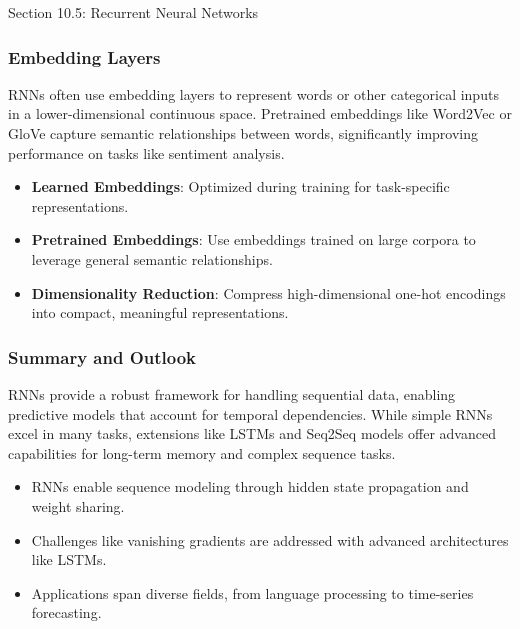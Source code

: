 \begin{notes}{Section 10.5: Recurrent Neural Networks}
    \subsubsection*{Embedding Layers}
    
    RNNs often use embedding layers to represent words or other categorical inputs in a lower-dimensional continuous space. Pretrained embeddings like Word2Vec or GloVe capture semantic relationships 
    between words, significantly improving performance on tasks like sentiment analysis.
    
    \begin{highlight}
        \begin{itemize}
            \item \textbf{Learned Embeddings}: Optimized during training for task-specific representations.
            \item \textbf{Pretrained Embeddings}: Use embeddings trained on large corpora to leverage general semantic relationships.
            \item \textbf{Dimensionality Reduction}: Compress high-dimensional one-hot encodings into compact, meaningful representations.
        \end{itemize}
    \end{highlight}
    
    \subsubsection*{Summary and Outlook}
    
    RNNs provide a robust framework for handling sequential data, enabling predictive models that account for temporal dependencies. While simple RNNs excel in many tasks, extensions like LSTMs and Seq2Seq 
    models offer advanced capabilities for long-term memory and complex sequence tasks.
    
    \begin{highlight}
        \begin{itemize}
            \item RNNs enable sequence modeling through hidden state propagation and weight sharing.
            \item Challenges like vanishing gradients are addressed with advanced architectures like LSTMs.
            \item Applications span diverse fields, from language processing to time-series forecasting.
        \end{itemize}
    \end{highlight}
\end{notes}

